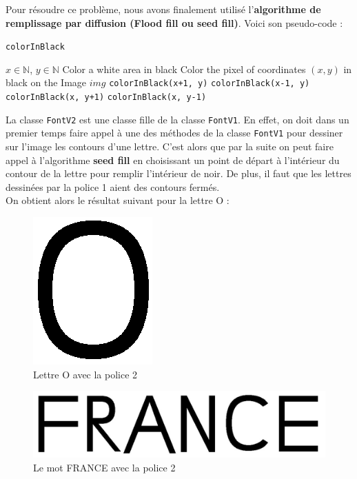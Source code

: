 \documentclass[a4paper, 12pt]{article}
\begin{document}
	Pour résoudre ce problème, nous avons finalement utilisé l'\textbf{algorithme de remplissage par diffusion (Flood fill ou seed fill)}. Voici son pseudo-code :
 
\begin{algorithm}
	\caption{\texttt{colorInBlack}}
		\begin{algorithmic}[1]
		\Require $x \in \mathbb{N}$, $y \in \mathbb{N}$
		\Ensure Color a white area in black
			\State \Return
		\EndIf
			\State Color the pixel of coordinates $(x, y)$ in black on the Image $img$
			\State \texttt{colorInBlack(x+1, y)} 
			\State \texttt{colorInBlack(x-1, y)} 
			\State \texttt{colorInBlack(x, y+1)} 
			\State \texttt{colorInBlack(x, y-1)} 
		\EndIf	
		\EndFunction
		\end{algorithmic}
\end{algorithm}
\newpage
La classe \texttt{FontV2} est une classe fille de la classe \texttt{FontV1}. En effet, on doit dans un premier temps faire appel à une des méthodes de la classe \texttt{FontV1} pour dessiner sur l'image les contours d'une lettre. C'est alors que par la suite on peut faire appel à l'algorithme \textbf{seed fill} en choisissant un point de départ à l'intérieur du contour de la lettre pour remplir l'intérieur de noir. De plus, il faut que les lettres dessinées par la police 1 aient des contours fermés.\\
On obtient alors le résultat suivant pour la lettre O : 

\begin{figure}[h]
\centering
\includegraphics[scale=0.9]{Images/FontV2_O.png}
\caption{Lettre O avec la police 2}
\label{fig5}
\end{figure}

\begin{figure}[h]
\centering
\includegraphics[scale=0.5]{Images/FRANCE_FontV2.jpeg}
\caption{Le mot FRANCE avec la police 2}
\label{fig6}
\end{figure}
\end{document}
